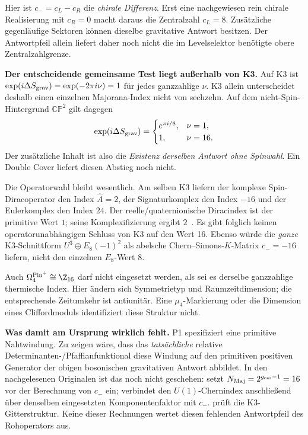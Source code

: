 Hier ist $c_-=c_L-c_R$ die \emph{chirale Differenz}. Erst eine nachgewiesen rein chirale Realisierung mit $c_R=0$ macht daraus die Zentralzahl $c_L=8$. Zusätzliche gegenläufige Sektoren können dieselbe gravitative Antwort besitzen. Der Antwortpfeil allein liefert daher noch nicht die im Levelselektor benötigte obere Zentralzahlgrenze.

\textbf{Der entscheidende gemeinsame Test liegt außerhalb von K3.}
Auf K3 ist $\exp(i\Delta S_{\rm grav})=\exp(-2\pi i\nu)=1$ für jedes ganzzahlige $\nu$. K3 allein unterscheidet deshalb einen einzelnen Majorana-Index nicht von sechzehn. Auf dem nicht-Spin-Hintergrund $\mathbb{CP}^2$ gilt dagegen
\begin{equation}
\exp(i\Delta S_{\rm grav})=
\begin{cases}
e^{\pi i/8},&\nu=1,\\
1,&\nu=16.
\end{cases}
\end{equation}
Der zusätzliche Inhalt ist also die \emph{Existenz derselben Antwort ohne Spinwahl}. Ein Double Cover liefert diesen Abstieg noch nicht.


Die Operatorwahl bleibt wesentlich. Am selben K3 liefern der komplexe Spin-Diracoperator den Index $\widehat A=2$, der Signaturkomplex den Index $-16$ und der Eulerkomplex den Index $24$. Der reelle/quaternionische Diracindex ist der primitive Wert $1$; seine Komplexifizierung ergibt $2$~\cite{absindex,atiyahsinger3}. Es gibt folglich keinen operatorunabhängigen Schluss von K3 auf den Wert 16. Ebenso würde die \emph{ganze} K3-Schnittform $U^3\oplus E_8(-1)^2$ als abelsche Chern--Simons-$K$-Matrix $c_-=-16$ liefern, nicht den einzelnen $E_8$-Wert $8$.

Auch $\Omega_4^{\mathrm{Pin}^+}\cong\Z_{16}$ darf nicht eingesetzt werden, als sei es derselbe ganzzahlige thermische Index. Hier ändern sich Symmetrietyp und Raumzeitdimension; die entsprechende Zeitumkehr ist antiunitär. Eine $\mu_4$-Markierung oder die Dimension eines Cliffordmoduls identifiziert diese Struktur nicht.

\textbf{Was damit am Ursprung wirklich fehlt.} P1 spezifiziert eine primitive Nahtwindung. Zu zeigen wäre, dass das \emph{tatsächliche} relative Determinanten-/Pfaffianfunktional diese Windung auf den primitiven positiven Generator der obigen bosonischen gravitativen Antwort abbildet. In den nachgelesenen Originalen ist das noch nicht geschehen:  setzt $N_{\rm Maj}=2^{g_{\rm car}-1}=16$ vor der Berechnung von $c_-$ ein;  verbindet den $U(1)$-Chernindex anschließend über denselben eingesetzten Komponentenfaktor mit $c_-$.  prüft die K3-Gitterstruktur. Keine dieser Rechnungen wertet diesen fehlenden Antwortpfeil des Rohoperators aus.

